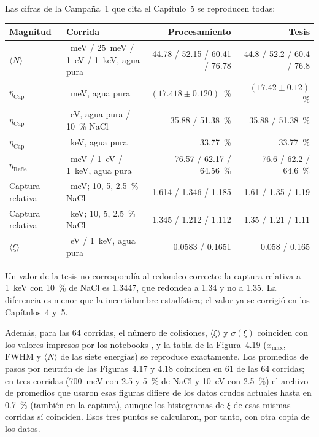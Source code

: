 \documentclass[11pt,a4paper]{article}
\newcommand{\archivo}[1]{\path{#1}}
\begin{document}
Las cifras de la Campaña~1 que cita el Capítulo~5 se reproducen todas:

\begin{center}
\small
\begin{tabularx}{\linewidth}{@{}l>{\raggedright\arraybackslash}Xrr@{}}
\toprule
\textbf{Magnitud} & \textbf{Corrida} & \textbf{Procesamiento} & \textbf{Tesis} \\
\midrule
$\langle N\rangle$ & 1~meV / 25~meV / 1~eV / 1~keV, agua pura & 44.78 / 52.15 / 60.41 / 76.78 & 44.8 / 52.2 / 60.4 / 76.8 \\
$\eta_\mathrm{Cap}$ & 1~meV, agua pura & $(17.418\pm0.120)$~\% & $(17.42\pm0.12)$~\% \\
$\eta_\mathrm{Cap}$ & 1~eV, agua pura / 10~\% NaCl & 35.88 / 51.38~\% & 35.88 / 51.38~\% \\
$\eta_\mathrm{Cap}$ & 1~keV, agua pura & 33.77~\% & 33.77~\% \\
$\eta_\mathrm{Refle}$ & 1~meV / 1~eV / 1~keV, agua pura & 76.57 / 62.17 / 64.56~\% & 76.6 / 62.2 / 64.6~\% \\
Captura relativa & 1~meV; 10, 5, 2.5~\% NaCl & 1.614 / 1.346 / 1.185 & 1.61 / 1.35 / 1.19 \\
Captura relativa & 1~keV; 10, 5, 2.5~\% NaCl & 1.345 / 1.212 / 1.112 & 1.35 / 1.21 / 1.11 \\
$\langle\xi\rangle$ & 1~eV / 1~keV, agua pura & 0.0583 / 0.1651 & 0.058 / 0.165 \\
\bottomrule
\end{tabularx}
\end{center}

Un valor de la tesis no correspondía al redondeo correcto: la captura relativa a 1~keV con 10~\% de NaCl es 1.3447, que redondea a 1.34 y no a 1.35. La diferencia es menor que la incertidumbre estadística; el valor ya se corrigió en los Capítulos~4 y~5.

Además, para las 64 corridas, el número de colisiones, $\langle\xi\rangle$ y $\sigma(\xi)$ coinciden con los valores impresos por los notebooks \archivo{Histogramas_cita_*.ipynb}, y la tabla de la Figura~4.19 ($x_\mathrm{max}$, FWHM y $\langle N\rangle$ de las siete energías) se reproduce exactamente. Los promedios de pasos por neutrón de las Figuras~4.17 y 4.18 coinciden en 61 de las 64 corridas; en tres corridas (700~meV con 2.5 y 5~\% de NaCl y 10~eV con 2.5~\%) el archivo de promedios que usaron esas figuras difiere de los datos crudos actuales hasta en 0.7~\% (también en la captura), aunque los histogramas de $\xi$ de esas mismas corridas sí coinciden. Esos tres puntos se calcularon, por tanto, con otra copia de los datos.
\end{document}
